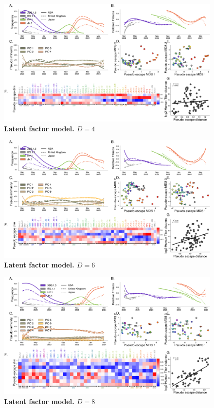 \documentclass[11pt,oneside,letterpaper]{article}
\begin{document}
\begin{figure}[t!]
    \centering
    \includegraphics[width=1.0\textwidth=0.01]{./supplementary_figures/latent_immune_4_dims.png}
    \caption{
      \textbf{Latent factor model. $D=4$}
    }
    \label{fig:latent_factor_4}
\end{figure}

\begin{figure}[t!]
    \centering
    \includegraphics[width=1.0\textwidth=0.01]{./supplementary_figures/latent_immune_6_dims.png}
    \caption{
      \textbf{Latent factor model. $D=6$}
    }
    \label{fig:latent_factor_6}
\end{figure}

\begin{figure}[t!]
    \centering
    \includegraphics[width=1.0\textwidth=0.01]{./supplementary_figures/latent_immune_8_dims.png}
    \caption{
      \textbf{Latent factor model. $D=8$}
    }
    \label{fig:latent_factor_8}
\end{figure}
\end{document}
